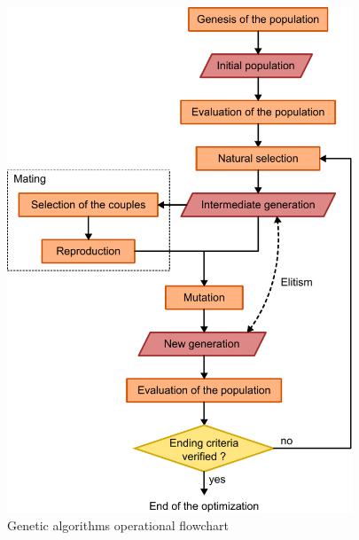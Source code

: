 \documentclass[twocol]{ametsoc}
\begin{document}
\begin{figure}[htb]
	\centerline{\includegraphics[width=10.3cm]{figure_structure_gas.pdf}}
	\caption{Genetic algorithms operational flowchart}
	\label{figure_structure_gas}
\end{figure}
\end{document}
